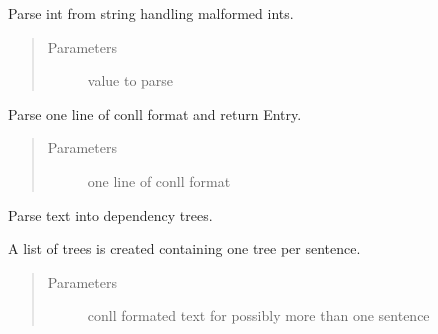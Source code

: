\documentclass[letterpaper,10pt,english]{sphinxmanual}
\begin{document}
\begin{fulllineitems}
\label{\detokenize{api:conll_parser.parse_int_value}}
Parse int from string handling malformed ints.
\begin{quote}\begin{description}
\item[{Parameters}] \leavevmode
{} \textendash{} value to parse

\end{description}\end{quote}

\end{fulllineitems}


\begin{fulllineitems}
\label{\detokenize{api:conll_parser.parse_line}}
Parse one line of conll format and return Entry.
\begin{quote}\begin{description}
\item[{Parameters}] \leavevmode
{} \textendash{} one line of conll format

\end{description}\end{quote}

\end{fulllineitems}


\begin{fulllineitems}
\label{\detokenize{api:conll_parser.parse_tree}}
Parse text into dependency trees.

A list of trees is created containing one tree per sentence.
\begin{quote}\begin{description}
\item[{Parameters}] \leavevmode
{} \textendash{} conll formated text for possibly more than one sentence

\end{description}\end{quote}

\end{fulllineitems}
\end{document}
